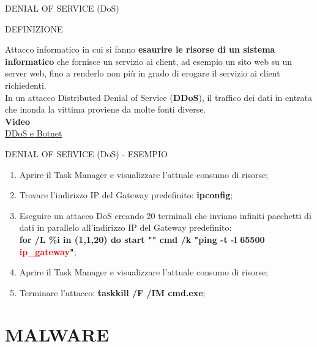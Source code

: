 \documentclass[aspectratio=1610]{beamer}
\begin{document}
\begin{frame}{DENIAL OF SERVICE (DoS)}
    \begin{alertblock}{DEFINIZIONE}
        \begin{minipage}{0.98\linewidth}
            \justifying
            Attacco informatico in cui si fanno \textbf{esaurire le risorse di un sistema informatico} 
            che fornisce un servizio ai client, ad esempio un sito web su un server web, 
            fino a renderlo non più in grado di erogare il servizio ai client richiedenti.\\
            In un attacco Distributed Denial of Service (\textbf{DDoS}), il traffico dei dati in entrata 
            che inonda la vittima proviene da molte fonti diverse.\\
            \bigskip
            \tiny{\textbf{Video}}\\
            \tiny{\href{https://www.youtube.com/watch?v=ilhGh9CEIwM}{DDoS e Botnet}}
        \end{minipage}
    \end{alertblock}
\end{frame}

\begin{frame}{DENIAL OF SERVICE (DoS) - ESEMPIO}
    \begin{enumerate}
        \item Aprire il Task Manager e visualizzare l’attuale consumo di risorse;
        \pause
        \item Trovare l'indirizzo IP del Gateway predefinito: \textbf{ipconfig};
        \pause
        \item Eseguire un attacco DoS creando 20 terminali che inviano infiniti pacchetti di dati in parallelo 
        all'indirizzo IP del Gateway predefinito:\\ 
        \textbf{for /L \%i in (1,1,20) do start "" cmd /k "ping -t -l 65500 \textcolor{red}{ip\_gateway}"};
        \pause
        \item Aprire il Task Manager e visualizzare l’attuale consumo di risorse;
        \pause
        \item Terminare l'attacco: \textbf{taskkill /F /IM cmd.exe};
    \end{enumerate}                        
\end{frame}

\section{MALWARE}
\end{document}
